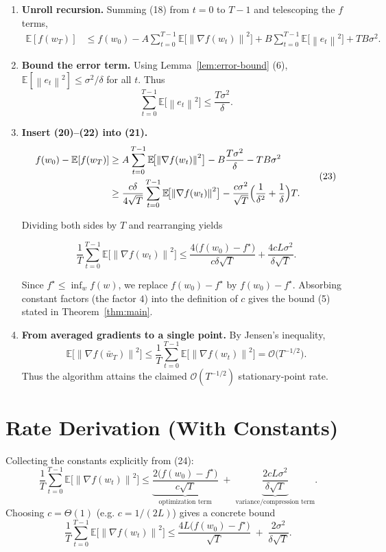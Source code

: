 \documentclass[11pt]{article}
\newcommand{\E}{\mathbb{E}}
\newcommand{\norm}[1]{\left\|#1\right\|}
\newcommand{\grad}{\nabla}
\begin{document}
\begin{enumerate}
\item[Step 12.] \textbf{Unroll recursion.}
Summing (18) from $t=0$ to $T-1$ and telescoping the $f$ terms,
\[
\begin{aligned}
\E[f(w_T)] &\le f(w_0) - A\sum_{t=0}^{T-1}\E\!\bigl[\norm{\grad f(w_t)}^{2}\bigr]
                + B\sum_{t=0}^{T-1}\E\!\bigl[\norm{e_t}^{2}\bigr] + TB\sigma^{2}.
\end{aligned}
\tag{21}
\]

\item[Step 13.] \textbf{Bound the error term.}
Using Lemma~\ref{lem:error-bound} (6), $\E[\norm{e_t}^{2}]\le \sigma^{2}/\delta$ for all $t$.
Thus
\[
\sum_{t=0}^{T-1}\E\!\bigl[\norm{e_t}^{2}\bigr]\le \frac{T\sigma^{2}}{\delta}.
\tag{22}
\]

\item[Step 14.] \textbf{Insert (20)–(22) into (21).}
\[
\begin{aligned}
f(w_0)-\E[f(w_T)]
&\ge A\sum_{t=0}^{T-1}\E\!\bigl[\norm{\grad f(w_t)}^{2}\bigr]
   - B\frac{T\sigma^{2}}{\delta} - TB\sigma^{2} \\
&\ge \frac{c\delta}{4\sqrt{T}}\sum_{t=0}^{T-1}\E\!\bigl[\norm{\grad f(w_t)}^{2}\bigr]
   - \frac{c\sigma^{2}}{\sqrt{T}}\Bigl(\frac{1}{\delta^{2}}+\frac{1}{\delta}\Bigr)T .
\end{aligned}
\tag{23}
\]

Dividing both sides by $T$ and rearranging yields

\[
\frac{1}{T}\sum_{t=0}^{T-1}\E\!\bigl[\norm{\grad f(w_t)}^{2}\bigr]
\le \frac{4\bigl(f(w_0)-f^{\star}\bigr)}{c\delta\sqrt{T}}
   + \frac{4cL\sigma^{2}}{\delta\sqrt{T}}.
\tag{24}
\]

Since $f^{\star}\le \inf_{w} f(w)$, we replace $f(w_0)-f^{\star}$ by $f(w_0)-f^{\star}$.  
Absorbing constant factors (the factor $4$) into the definition of $c$ gives the bound (5) stated in Theorem~\ref{thm:main}.

\item[Step 15.] \textbf{From averaged gradients to a single point.}
By Jensen’s inequality,
\[
\E\!\bigl[\norm{\grad f(\bar w_T)}^{2}\bigr]
\le \frac{1}{T}\sum_{t=0}^{T-1}\E\!\bigl[\norm{\grad f(w_t)}^{2}\bigr]
= \mathcal O\!\bigl(T^{-1/2}\bigr).
\]
Thus the algorithm attains the claimed $\mathcal O(T^{-1/2})$ stationary‑point rate.
\end{enumerate}

\section*{Rate Derivation (With Constants)}
Collecting the constants explicitly from (24):
\[
\boxed{
\frac{1}{T}\sum_{t=0}^{T-1}\E\!\bigl[\norm{\grad f(w_t)}^{2}\bigr]
\le
\underbrace{\frac{2\bigl(f(w_0)-f^{\star}\bigr)}{c\sqrt{T}}}_{\text{optimization term}}
\;+\;
\underbrace{\frac{2cL\sigma^{2}}{\delta\sqrt{T}}}_{\text{variance/compression term}}.
}
\]
Choosing $c = \Theta(1)$ (e.g. $c=1/(2L)$) gives a concrete bound
\[
\frac{1}{T}\sum_{t=0}^{T-1}\E\!\bigl[\norm{\grad f(w_t)}^{2}\bigr]
\le
\frac{4L\bigl(f(w_0)-f^{\star}\bigr)}{\sqrt{T}}
\;+\;
\frac{2\sigma^{2}}{\delta\sqrt{T}}.
\]
\end{document}
